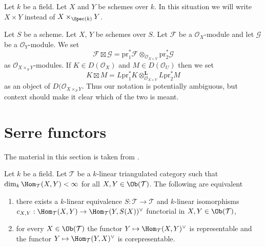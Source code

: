 \medskip\noindent
Let $k$ be a field. Let $X$ and $Y$ be schemes over $k$. In this
situation we will write $X \times Y$ instead of $X \times_{\Spec(k)} Y$.


\medskip\noindent
Let $S$ be a scheme. Let $X$, $Y$ be schemes over $S$.
Let $\mathcal{F}$ be a $\mathcal{O}_X$-module and let
$\mathcal{G}$ be a $\mathcal{O}_Y$-module. We set
$$
\mathcal{F} \boxtimes \mathcal{G} =
\text{pr}_1^*\mathcal{F} \otimes_{\mathcal{O}_{X \times Y}}
\text{pr}_2^*\mathcal{G}
$$
as $\mathcal{O}_{X \times_S Y}$-modules.
If $K \in D(\mathcal{O}_X)$ and $M \in D(\mathcal{O}_U)$ then we set
$$
K \boxtimes M =
L\text{pr}_1^*K \otimes_{\mathcal{O}_{X \times Y}}^\mathbf{L} L\text{pr}_2^*M
$$
as an object of $D(\mathcal{O}_{X \times_S Y}$.
Thus our notation is potentially ambiguous, but context should make it clear
which of the two is meant.





\section{Serre functors}
\label{section-Serre-functors}

\noindent
The material in this section is taken from \cite{Bondal-Kapranov}.

\begin{lemma}
\label{lemma-Serre-functor-exists}
Let $k$ be a field. Let $\mathcal{T}$ be a $k$-linear
triangulated category such that $\dim_k \Hom_\mathcal{T}(X, Y) < \infty$
for all $X, Y \in \Ob(\mathcal{T})$. The following are equivalent
\begin{enumerate}
\item there exists a $k$-linear equivalence
$S : \mathcal{T} \to \mathcal{T}$ and $k$-linear isomorphisms
$c_{X, Y} : \Hom_\mathcal{T}(X, Y) \to \Hom_\mathcal{T}(Y, S(X))^\vee$
functorial in $X, Y \in \Ob(\mathcal{T})$,
\item for every $X \in \Ob(\mathcal{T})$
the functor $Y \mapsto \Hom_\mathcal{T}(X, Y)^\vee$
is representable and the functor $Y \mapsto \Hom_\mathcal{T}(Y, X)^\vee$
is corepresentable.
\end{enumerate}
\end{lemma}

